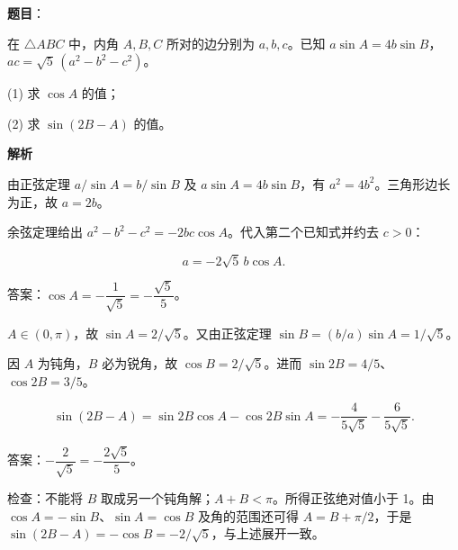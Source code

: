 \begin{answer}

\textbf{题目}：

在 $\triangle ABC$ 中，内角 $A,B,C$ 所对的边分别为 $a,b,c$。已知 $a\sin A=4b\sin B$，$ac=\sqrt5\,(a^2-b^2-c^2)$。

(1)   求 $\cos A$ 的值；

(2)   求 $\sin(2B-A)$ 的值。

\textbf{解析}


由正弦定理 $a/\sin A=b/\sin B$ 及 $a\sin A=4b\sin B$，有 $a^2=4b^2$。三角形边长为正，故 $a=2b$。

余弦定理给出 $a^2-b^2-c^2=-2bc\cos A$。代入第二个已知式并约去 $c>0$：

\nopagebreak[4]
\[a=-2\sqrt5\,b\cos A.\]

答案：$\boxed{\cos A=-\dfrac1{\sqrt5}=-\dfrac{\sqrt5}{5}}$。


$A\in(0,\pi)$，故 $\sin A=2/\sqrt5$。又由正弦定理 $\sin B=(b/a)\sin A=1/\sqrt5$。

因 $A$ 为钝角，$B$ 必为锐角，故 $\cos B=2/\sqrt5$。进而 $\sin2B=4/5$、$\cos2B=3/5$。

\nopagebreak[4]
\[\sin(2B-A)=\sin2B\cos A-\cos2B\sin A=-\frac4{5\sqrt5}-\frac6{5\sqrt5}.\]

答案：$\boxed{-\dfrac2{\sqrt5}=-\dfrac{2\sqrt5}{5}}$。

检查：不能将 $B$ 取成另一个钝角解；$A+B<\pi$。所得正弦绝对值小于 1。由 $\cos A=-\sin B$、$\sin A=\cos B$ 及角的范围还可得 $A=B+\pi/2$，于是 $\sin(2B-A)=-\cos B=-2/\sqrt5$，与上述展开一致。



\end{answer}
